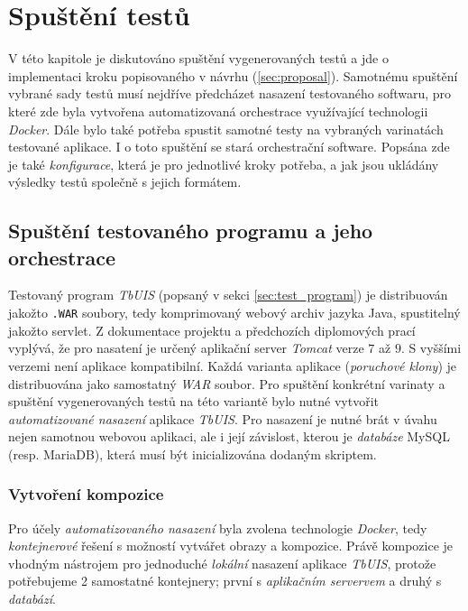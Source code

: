 \documentclass[czech, ma, kiv, he, iso690numb, pdf, viewonly]{fasthesis}
\begin{document}
\chapter{Spuštění testů}
 
    V této kapitole je diskutováno spuštění vygenerovaných testů a jde o implementaci kroku popisovaného v návrhu (\ref{sec:proposal}). Samotnému spuštění vybrané sady testů musí nejdříve předcházet nasazení testovaného softwaru, pro které zde byla vytvořena automatizovaná orchestrace využívající technologii \textit{Docker}. Dále bylo také potřeba spustit samotné testy na vybraných varinatách testované aplikace. I o toto spuštění se stará orchestrační software. Popsána zde je také \emph{konfigurace}, která je pro jednotlivé kroky potřeba, a jak jsou ukládány výsledky testů společně s jejich formátem.

    \section{Spuštění testovaného programu a jeho orchestrace}

    Testovaný program \textit{TbUIS} (popsaný v sekci \ref{sec:test_program}) je distribuován jakožto \verb|.WAR| soubory, tedy komprimovaný webový archiv jazyka Java, spustitelný jakožto \gls{servlet}. Z dokumentace projektu a předchozích diplomových prací vyplývá, že pro nasatení je určený aplikační server \textit{Tomcat} verze \(7\) až \(9\). S vyššími verzemi není aplikace kompatibilní. Každá varianta aplikace (\textit{poruchové klony}) je distribuována jako samostatný \textit{WAR} soubor. Pro spuštění konkrétní varinaty a spuštění vygenerovaných testů na této variantě bylo nutné vytvořit \textit{automatizované nasazení} aplikace \textit{TbUIS}. Pro nasazení je nutné brát v úvahu nejen samotnou webovou aplikaci, ale i její závislost, kterou je \textit{databáze} MySQL (resp. MariaDB), která musí být inicializována dodaným skriptem.

    \subsection{Vytvoření kompozice} \label{sec:composition}
    Pro účely \textit{automatizovaného nasazení} byla zvolena technologie \textit{Docker}, tedy \textit{kontejnerové} řešení s možností vytvářet obrazy a kompozice. Právě kompozice je vhodným nástrojem pro jednoduché \textit{lokální} nasazení aplikace \textit{TbUIS}, protože potřebujeme 2 samostatné kontejnery; první s \textit{aplikačním servervem} a druhý s \textit{databází}.
\end{document}
